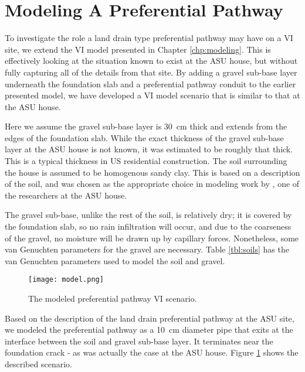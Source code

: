 \section{Modeling A Preferential Pathway}

To investigate the role a land drain type preferential pathway may have on a VI site, we extend the VI model presented in Chapter \ref{chp:modeling}.
This is effectively looking at the situation known to exist at the ASU house, but without fully capturing all of the details from that site.
By adding a gravel sub-base layer underneath the foundation slab and a preferential pathway conduit to the earlier presented model, we have developed a VI model scenario that is similar to that at the ASU house.\par

Here we assume the gravel sub-base layer is \SI{30}{\centi\metre} thick and extends from the edges of the foundation slab.
While the exact thickness of the gravel sub-base layer at the ASU house is not known, it was estimated to be roughly that thick.
This is a typical thickness in US residential construction.
The soil surrounding the house is assumed to be homogenous sandy clay.
This is based on a description of the soil, and was chosen as the appropriate choice in modeling work by \citeauthor{guo_vapor_2015}\cite{guo_vapor_2015}, one of the researchers at the ASU house.\par

The gravel sub-base, unlike the rest of the soil, is relatively dry; it is covered by the foundation slab, so no rain infiltration will occur, and due to the coarseness of the gravel, no moisture will be drawn up by capillary forces.
Nonetheless, some van Genuchten parameters for the gravel are necessary.
Table \ref{tbl:soils} has the van Genuchten parameters used to model the soil and gravel.\par

\begin{figure}[hbt!]
  \centering
  \texttt{[image: model.png]}
  \caption{The modeled preferential pathway VI scenario.}
  \label{fig:model_preferential_pathway}
\end{figure}

Based on the description of the land drain preferential pathway at the ASU site, we modeled the preferential pathway as a \SI{10}{\centi\metre} diameter pipe that exits at the interface between the soil and gravel sub-base layer.
It terminates near the foundation crack - as was actually the case at the ASU house\cite{guo_identification_2015}.
Figure \ref{fig:model_preferential_pathway} shows the described scenario.\par

